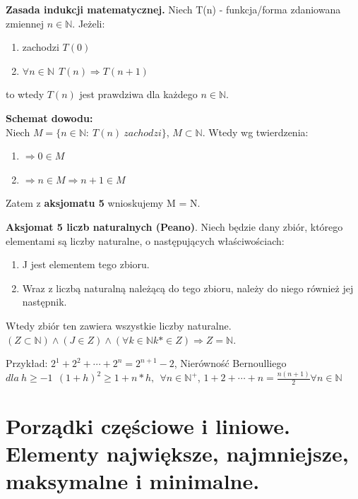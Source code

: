 \documentclass[12pt]{article}
\begin{document}
    \begin{theorem}
        \textbf{Zasada indukcji matematycznej.} Niech T(n) - funkcja/forma zdaniowana zmiennej $n \in \mathbb{N}$. Jeżeli:
        \begin{enumerate}
            \item zachodzi $T(0)$
            \item $\forall n \in \mathbb{N} ~~ T(n) \Rightarrow  T(n+1)$
        \end{enumerate}
        to wtedy $T(n)$ jest prawdziwa dla każdego $n \in \mathbb{N}$.
    \end{theorem}

    \textbf{Schemat dowodu:}\\

    Niech $M = \{ n \in \mathbb{N}: ~ T(n) ~ zachodzi \}$, $M \subset \mathbb{N}$. Wtedy wg twierdzenia:
    \begin{enumerate}
        \item $\Rightarrow 0 \in M$
        \item $\Rightarrow n \in M \Rightarrow n+1 \in M$
    \end{enumerate}
    Zatem z \textbf{aksjomatu 5} wnioskujemy M = N.

    \begin{theorem}
        \textbf{Aksjomat 5 liczb naturalnych (Peano)}. Niech będzie dany zbiór, którego elementami są liczby
        naturalne, o następujących właściwościach:
        \begin{enumerate}
            \item J jest elementem tego zbioru.
            \item Wraz z liczbą naturalną należącą do tego zbioru, należy do niego również jej następnik.
        \end{enumerate}
        Wtedy zbiór ten zawiera wszystkie liczby naturalne.
        $(Z \subset \mathbb{N}) \wedge (J \in Z) \wedge (\forall k \in \mathbb{N} k* \in Z) \Rightarrow Z = \mathbb{N}$.
    \end{theorem}

    Przykład: $2^1 + 2^2 + \cdots + 2^n = 2^{n+1} - 2$, Nierówność Bernoulliego
    $dla ~ h \geq -1 ~~ (1+h)^2 \geq 1 + n*h, ~~ \forall n \in \mathbb{N}^{+}$, $1 + 2 + \cdots + n = \frac{n(n+1)}{2} \forall n \in \mathbb{N}$

    \section{Porządki częściowe i liniowe. Elementy największe, najmniejsze, maksymalne i minimalne.}
\end{document}

